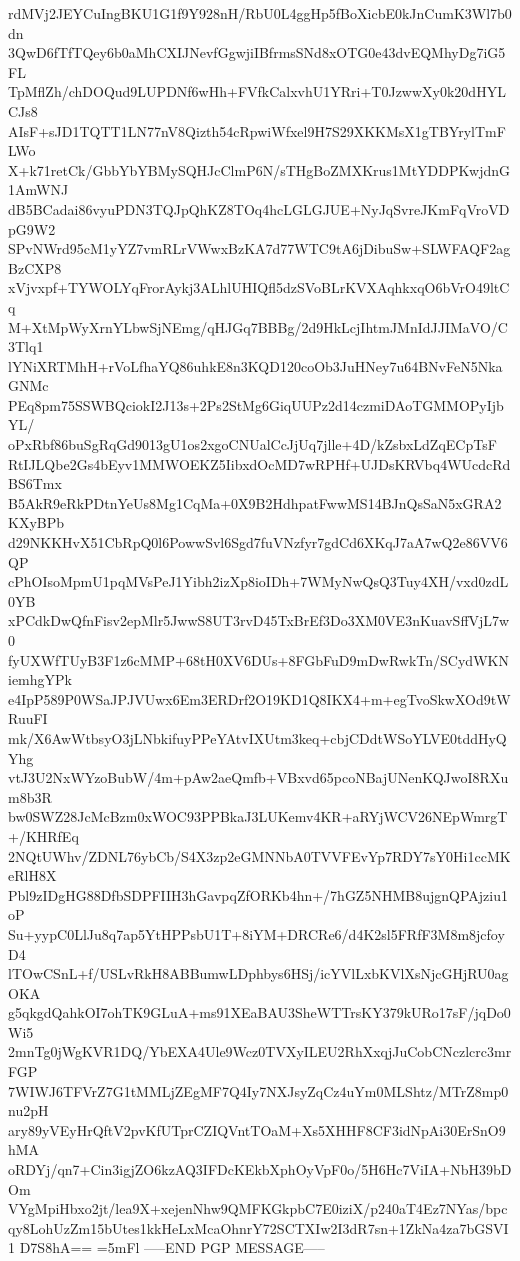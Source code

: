 rdMVj2JEYCuIngBKU1G1f9Y928nH/RbU0L4ggHp5fBoXicbE0kJnCumK3Wl7b0dn
3QwD6fTfTQey6b0aMhCXIJNevfGgwjiIBfrmsSNd8xOTG0e43dvEQMhyDg7iG5FL
TpMflZh/chDOQud9LUPDNf6wHh+FVfkCalxvhU1YRri+T0JzwwXy0k20dHYLCJs8
AIsF+sJD1TQTT1LN77nV8Qizth54cRpwiWfxel9H7S29XKKMsX1gTBYrylTmFLWo
X+k71retCk/GbbYbYBMySQHJcClmP6N/sTHgBoZMXKrus1MtYDDPKwjdnG1AmWNJ
dB5BCadai86vyuPDN3TQJpQhKZ8TOq4hcLGLGJUE+NyJqSvreJKmFqVroVDpG9W2
SPvNWrd95cM1yYZ7vmRLrVWwxBzKA7d77WTC9tA6jDibuSw+SLWFAQF2agBzCXP8
xVjvxpf+TYWOLYqFrorAykj3ALhlUHIQfl5dzSVoBLrKVXAqhkxqO6bVrO49ltCq
M+XtMpWyXrnYLbwSjNEmg/qHJGq7BBBg/2d9HkLcjIhtmJMnIdJJIMaVO/C3Tlq1
lYNiXRTMhH+rVoLfhaYQ86uhkE8n3KQD120coOb3JuHNey7u64BNvFeN5NkaGNMc
PEq8pm75SSWBQciokI2J13s+2Ps2StMg6GiqUUPz2d14czmiDAoTGMMOPyIjbYL/
oPxRbf86buSgRqGd9013gU1os2xgoCNUalCcJjUq7jlle+4D/kZsbxLdZqECpTsF
RtIJLQbe2Gs4bEyv1MMWOEKZ5IibxdOcMD7wRPHf+UJDsKRVbq4WUcdcRdBS6Tmx
B5AkR9eRkPDtnYeUs8Mg1CqMa+0X9B2HdhpatFwwMS14BJnQsSaN5xGRA2KXyBPb
d29NKKHvX51CbRpQ0l6PowwSvl6Sgd7fuVNzfyr7gdCd6XKqJ7aA7wQ2e86VV6QP
cPhOIsoMpmU1pqMVsPeJ1Yibh2izXp8ioIDh+7WMyNwQsQ3Tuy4XH/vxd0zdL0YB
xPCdkDwQfnFisv2epMlr5JwwS8UT3rvD45TxBrEf3Do3XM0VE3nKuavSffVjL7w0
fyUXWfTUyB3F1z6cMMP+68tH0XV6DUs+8FGbFuD9mDwRwkTn/SCydWKNiemhgYPk
e4IpP589P0WSaJPJVUwx6Em3ERDrf2O19KD1Q8IKX4+m+egTvoSkwXOd9tWRuuFI
mk/X6AwWtbsyO3jLNbkifuyPPeYAtvIXUtm3keq+cbjCDdtWSoYLVE0tddHyQYhg
vtJ3U2NxWYzoBubW/4m+pAw2aeQmfb+VBxvd65pcoNBajUNenKQJwoI8RXum8b3R
bw0SWZ28JcMcBzm0xWOC93PPBkaJ3LUKemv4KR+aRYjWCV26NEpWmrgT+/KHRfEq
2NQtUWhv/ZDNL76ybCb/S4X3zp2eGMNNbA0TVVFEvYp7RDY7sY0Hi1ccMKeRlH8X
Pbl9zIDgHG88DfbSDPFIIH3hGavpqZfORKb4hn+/7hGZ5NHMB8ujgnQPAjziu1oP
Su+yypC0LlJu8q7ap5YtHPPsbU1T+8iYM+DRCRe6/d4K2sl5FRfF3M8m8jcfoyD4
lTOwCSnL+f/USLvRkH8ABBumwLDphbys6HSj/icYVlLxbKVlXsNjcGHjRU0agOKA
g5qkgdQahkOI7ohTK9GLuA+ms91XEaBAU3SheWTTrsKY379kURo17sF/jqDo0Wi5
2mnTg0jWgKVR1DQ/YbEXA4Ule9Wcz0TVXyILEU2RhXxqjJuCobCNczlcrc3mrFGP
7WIWJ6TFVrZ7G1tMMLjZEgMF7Q4Iy7NXJsyZqCz4uYm0MLShtz/MTrZ8mp0nu2pH
ary89yVEyHrQftV2pvKfUTprCZIQVntTOaM+Xs5XHHF8CF3idNpAi30ErSnO9hMA
oRDYj/qn7+Cin3igjZO6kzAQ3IFDcKEkbXphOyVpF0o/5H6Hc7ViIA+NbH39bDOm
VYgMpiHbxo2jt/lea9X+xejenNhw9QMFKGkpbC7E0iziX/p240aT4Ez7NYas/bpc
qy8LohUzZm15bUtes1kkHeLxMcaOhnrY72SCTXIw2I3dR7sn+1ZkNa4za7bGSVI1
D7S8hA==
=5mFl
-----END PGP MESSAGE-----
